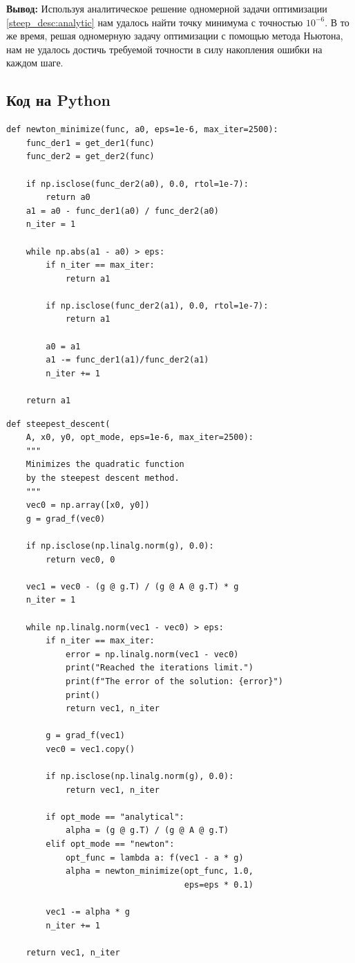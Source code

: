 \documentclass[12pt]{article}%
\begin{document}
\textbf{Вывод:} Используя аналитическое решение одномерной задачи оптимизации \ref{steep_desc:analytic} нам удалось найти точку минимума с точностью $10^{-6}$. В то же время, решая одномерную задачу оптимизации с помощью метода Ньютона, нам не удалось достичь требуемой точности в силу накопления ошибки на каждом шаге.


\subsection{Код на Python}
\begin{verbatim}
def newton_minimize(func, a0, eps=1e-6, max_iter=2500):
    func_der1 = get_der1(func)
    func_der2 = get_der2(func)

    if np.isclose(func_der2(a0), 0.0, rtol=1e-7):
        return a0
    a1 = a0 - func_der1(a0) / func_der2(a0)
    n_iter = 1
    
    while np.abs(a1 - a0) > eps:
        if n_iter == max_iter:
            return a1
        
        if np.isclose(func_der2(a1), 0.0, rtol=1e-7):
            return a1
            
        a0 = a1
        a1 -= func_der1(a1)/func_der2(a1)
        n_iter += 1
    
    return a1
\end{verbatim}

\begin{verbatim}
def steepest_descent(
    A, x0, y0, opt_mode, eps=1e-6, max_iter=2500):
    """
    Minimizes the quadratic function 
    by the steepest descent method.
    """
    vec0 = np.array([x0, y0])
    g = grad_f(vec0)
    
    if np.isclose(np.linalg.norm(g), 0.0):
        return vec0, 0
    
    vec1 = vec0 - (g @ g.T) / (g @ A @ g.T) * g
    n_iter = 1

    while np.linalg.norm(vec1 - vec0) > eps:
        if n_iter == max_iter:
            error = np.linalg.norm(vec1 - vec0)
            print("Reached the iterations limit.")
            print(f"The error of the solution: {error}")
            print()
            return vec1, n_iter
        
        g = grad_f(vec1)
        vec0 = vec1.copy()
        
        if np.isclose(np.linalg.norm(g), 0.0):
            return vec1, n_iter

        if opt_mode == "analytical":
            alpha = (g @ g.T) / (g @ A @ g.T)
        elif opt_mode == "newton":
            opt_func = lambda a: f(vec1 - a * g)
            alpha = newton_minimize(opt_func, 1.0, 
                                    eps=eps * 0.1)
            
        vec1 -= alpha * g
        n_iter += 1

    return vec1, n_iter
\end{verbatim}
\end{document}
